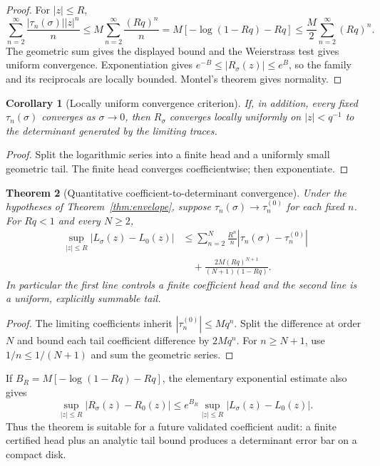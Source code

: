 \documentclass[11pt]{article}
\newtheorem{theorem}{Theorem}[section]
\newtheorem{corollary}[theorem]{Corollary}
\theoremstyle{remark}
\begin{document}
\begin{proof}
For $|z|\le R$,
\[
 \sum_{n=2}^{\infty}\frac{|\tau_n(\sigma)||z|^n}{n}
 \le M\sum_{n=2}^{\infty}\frac{(Rq)^n}{n}
 =M[-\log(1-Rq)-Rq]
 \le \frac{M}{2}\sum_{n=2}^{\infty}(Rq)^n.
\]
The geometric sum gives the displayed bound and the Weierstrass test gives
uniform convergence.  Exponentiation gives
$e^{-B}\le|R_\sigma(z)|\le e^B$, so the family and its reciprocals are
locally bounded.  Montel's theorem gives normality.
\end{proof}

\begin{corollary}[Locally uniform convergence criterion]
If, in addition, every fixed $\tau_n(\sigma)$ converges as
$\sigma\to0$, then $R_\sigma$ converges locally uniformly on
$|z|<q^{-1}$ to the determinant generated by the limiting traces.
\end{corollary}

\begin{proof}
Split the logarithmic series into a finite head and a uniformly small
geometric tail.  The finite head converges coefficientwise; then exponentiate.
\end{proof}

\begin{theorem}[Quantitative coefficient-to-determinant convergence]
Under the hypotheses of Theorem~\ref{thm:envelope}, suppose
$\tau_n(\sigma)\to\tau_n^{(0)}$ for each fixed $n$.  For $Rq<1$ and every
$N\ge2$,
\begin{align*}
 \sup_{|z|\le R}|L_\sigma(z)-L_0(z)|
 &\le \sum_{n=2}^{N}\frac{R^n}{n}
       |\tau_n(\sigma)-\tau_n^{(0)}|\\
 &\quad+
 \frac{2M(Rq)^{N+1}}{(N+1)(1-Rq)}.
\end{align*}
In particular the first line controls a finite coefficient head and the
second line is a uniform, explicitly summable tail.
\end{theorem}

\begin{proof}
The limiting coefficients inherit $|\tau_n^{(0)}|\le Mq^n$.  Split the
difference at order $N$ and bound each tail coefficient difference by
$2Mq^n$.  For $n\ge N+1$, use $1/n\le1/(N+1)$ and sum the geometric series.
\end{proof}

If $B_R=M[-\log(1-Rq)-Rq]$, the elementary exponential estimate also gives
\[
 \sup_{|z|\le R}|R_\sigma(z)-R_0(z)|
 \le e^{B_R}
      \sup_{|z|\le R}|L_\sigma(z)-L_0(z)|.
\]
Thus the theorem is suitable for a future validated coefficient audit: a
finite certified head plus an analytic tail bound produces a determinant
error bar on a compact disk.
\end{document}
